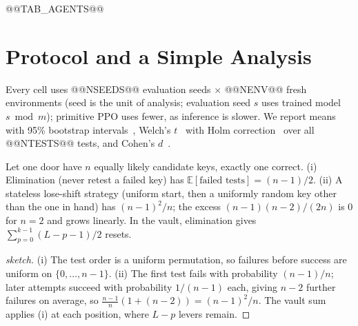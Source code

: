 \documentclass[runningheads]{llncs}
\begin{document}
@@TAB_AGENTS@@

\section{Protocol and a Simple Analysis}
Every cell uses @@NSEEDS@@ evaluation seeds $\times$ @@NENV@@ fresh environments (seed is the unit of analysis; evaluation seed $s$ uses trained model $s \bmod m$); primitive PPO uses fewer, as inference is slower. We report means with 95\% bootstrap intervals~\cite{efron1993}, Welch's $t$~\cite{welch1947} with Holm correction~\cite{holm1979} over all @@NTESTS@@ tests, and Cohen's $d$~\cite{cohen1988}.

\begin{proposition}
Let one door have $n$ equally likely candidate keys, exactly one correct. (i) Elimination (never retest a failed key) has $\mathbb{E}[\text{failed tests}]=(n-1)/2$. (ii) A stateless lose-shift strategy (uniform start, then a uniformly random key other than the one in hand) has $(n-1)^2/n$; the excess $(n-1)(n-2)/(2n)$ is $0$ for $n=2$ and grows linearly. In the vault, elimination gives $\sum_{p=0}^{k-1}(L-p-1)/2$ resets.
\end{proposition}
\begin{proof}[sketch]
(i) The test order is a uniform permutation, so failures before success are uniform on $\{0,\dots,n-1\}$. (ii) The first test fails with probability $(n-1)/n$; later attempts succeed with probability $1/(n-1)$ each, giving $n-2$ further failures on average, so $\frac{n-1}{n}(1+(n-2))=(n-1)^2/n$. The vault sum applies (i) at each position, where $L-p$ levers remain.
\end{proof}
\end{document}
